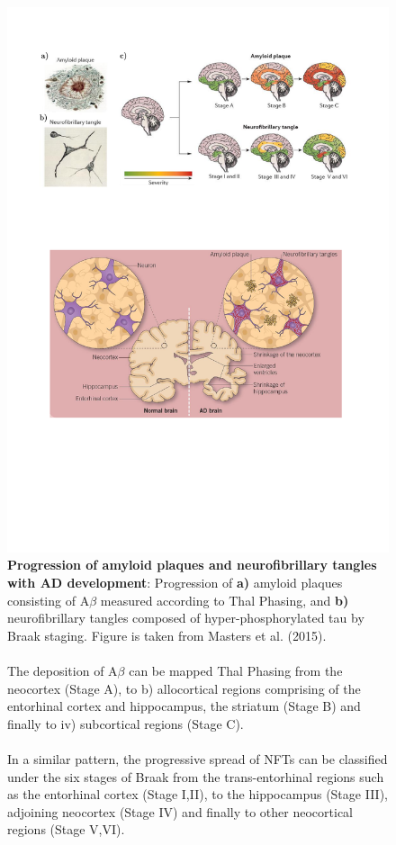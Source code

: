 \begin{figure}[!htp]
	\centering
	\includegraphics[page=1,trim={0 19cm 0cm 0cm},clip, scale = 0.8]{Figures/Introduction_Figures.pdf}
	\captionsetup{width=0.95\textwidth,singlelinecheck=off}
	\caption[Progression of amyloid plaques and neurofibrillary tangles with AD development]%
	{\textbf{Progression of amyloid plaques and neurofibrillary tangles with AD development}: Progression of \textbf{a)} amyloid plaques consisting of A$\beta$ measured according to Thal Phasing\cite{DR2002}, and \textbf{b)} neurofibrillary tangles composed of hyper-phosphorylated tau by Braak staging\cite{H1991}. Figure is taken from Masters et al. (2015)\cite{Masters2015}. 
		\\
		\\ 
		The deposition of A$\beta$ can be mapped Thal Phasing from the neocortex (Stage A), to b) allocortical regions comprising of the entorhinal cortex and hippocampus, the striatum (Stage B) and finally to iv) subcortical regions (Stage C)\cite{DR2002}. 
		\\
		\\
		In a similar pattern, the progressive spread of NFTs can be classified under the six stages of Braak from the trans-entorhinal regions such as the entorhinal cortex (Stage I,II), to the hippocampus (Stage III), adjoining neocortex (Stage IV) and finally to other neocortical regions (Stage V,VI)\cite{H1991}. 	
	}
	\label{fig:AD_development}
\end{figure}

